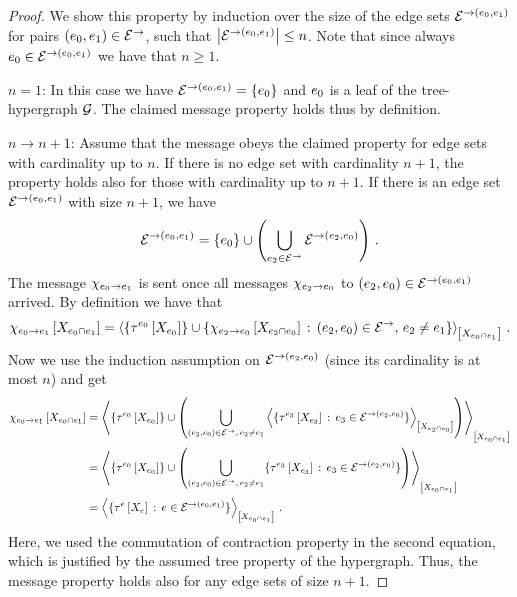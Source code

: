 \begin{proof}
    We show this property by induction over the size of the edge sets $\mathcal{E}^{\rightarrow(e_{0},e_{1})}$ for pairs $(e_{0},e_{1})\in\mathcal{E}^{\rightarrow}$, such that $\left|\mathcal{E}^{\rightarrow(e_{0},e_{1})}\right|\leq n$.
    Note that since always $e_{0}\in\mathcal{E}^{\rightarrow(e_{0},e_{1})}$ we have that $n\geq1$.

    $n=1$: In this case we have $\mathcal{E}^{\rightarrow(e_{0},e_{1})}=\{e_{0}\}$ and $e_{0}$ is a leaf of the tree-hypergraph $\mathcal{G}$.
    The claimed message property holds thus by definition.

    $n\rightarrow n+1$: Assume that the message obeys the claimed property for edge sets with cardinality up to $n$.
    If there is no edge set with cardinality $n+1$, the property holds also for those with cardinality up to $n+1$.
    If there is an edge set $\mathcal{E}^{\rightarrow(e_{0},e_{1})}$ with size $n+1$, we have
    \begin{align*}
        \mathcal{E}^{\rightarrow(e_{0},e_{1})}
        = \{e_{0}\} \cup \left(\bigcup_{e_{2} \in\mathcal{E}^{\rightarrow}} \mathcal{E}^{\rightarrow(e_{2},e_{0})}\right) \, .
    \end{align*}
    The message $\chi_{e_{0} \rightarrow e_{1}}$ is sent once all messages $\chi_{e_{2} \rightarrow e_{0}}$ to $(e_{2},e_{0})\in\mathcal{E}^{\rightarrow(e_{0},e_{1})}$ arrived.
    By definition we have that
    \begin{align*}
        \chi_{e_{0} \rightarrow e_{1}}\left[X_{e_{0} \cap e_{1}}\right]
        = \left\langle \{\tau^{e_{0}}\left[X_{e_{0}}\right]\}
            \cup \{\chi_{e_{2} \rightarrow e_{0}}\left[X_{e_{2} \cap e_{0}}\right] \,:\, (e_{2},e_{0}) \in\mathcal{E}^{\rightarrow} ,\, e_{2} \neq e_{1} \}
        \right\rangle_{\left[ X_{e_{0}\cap e_{1}} \right]}\,.
    \end{align*}
    Now we use the induction assumption on $\mathcal{E}^{\rightarrow(e_{2},e_{0})}$ (since its cardinality is at most $n$) and get
    \begin{align*}
        \chi_{e_{0} \rightarrow e_{1}}\left[X_{e_{0}\cap e_{1}}\right]
        &= \left\langle 
            \{\tau^{e_{0}}\left[X_{e_{0}}\right]\} \cup
            \left(\bigcup_{(e_{2},e_{0})\in\mathcal{E}^{\rightarrow} ,\, e_{2}\neq e_{1}}
                \left\langle \{\tau^{e_{3}}\left[X_{e_{3}}\right] \,:\,  e_{3} \in \mathcal{E}^{\rightarrow(e_{2},e_{0})}\}\right\rangle_{\left[ X_{e_{2}\cap e_{0}} \right]} \right)
        \right\rangle_{\left[ X_{e_{0}\cap e_{1}} \right]} \\
        &= \left\langle 
            \{\tau^{e_{0}}\left[X_{e_{0}}\right]\} \cup
            \left(\bigcup_{(e_{2},e_{0})\in\mathcal{E}^{\rightarrow} ,\, e_{2}\neq e_{1}} \{\tau^{e_{3}}\left[X_{e_{3}}\right] \,:\,  e_{3} \in \mathcal{E}^{\rightarrow(e_{2},e_{0})}\} \right)
        \right\rangle_{\left[ X_{e_{0}\cap e_{1}} \right]} \\
        &= \left\langle \{\tau^{e}\left[X_{e}\right]\,:\,e\in\mathcal{E}^{\rightarrow(e_{0},e_{1})}\}\right\rangle_{\left[ X_{e_{0}\cap e_{1}} \right]}\,.
    \end{align*}
    Here, we used the commutation of contraction property in the second equation, which is justified by the assumed tree property of the hypergraph.
    Thus, the message property holds also for any edge sets of size $n+1$.


\end{proof}
